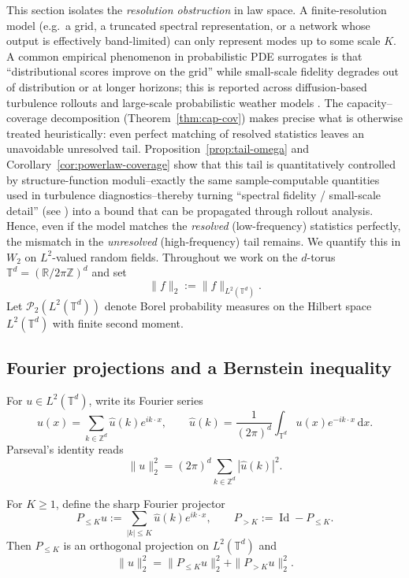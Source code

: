 \documentclass{article}
\numberwithin{equation}{section}
\theoremstyle{plain}
\theoremstyle{definition}
\theoremstyle{remark}
\begin{document}
This section isolates the \emph{resolution obstruction} in law space.
A finite-resolution model (e.g.\ a grid, a truncated spectral representation, or a network whose output
is effectively band-limited) can only represent modes up to some scale $K$. A common empirical phenomenon in probabilistic PDE surrogates is that “distributional scores improve on the grid” while small-scale fidelity degrades out of distribution or at longer horizons; this is reported across diffusion-based turbulence rollouts and large-scale probabilistic weather models \cite{kohl2023benchmarking, bulte2025probabilistic}.
The capacity–coverage decomposition (Theorem~\ref{thm:cap-cov}) makes precise what is otherwise treated heuristically: even perfect matching of resolved statistics leaves an unavoidable unresolved tail. Proposition~\ref{prop:tail-omega} and Corollary~\ref{cor:powerlaw-coverage} show that this tail is quantitatively controlled by structure-function moduli--exactly the same sample-computable quantities used in turbulence diagnostics--thereby turning “spectral fidelity / small-scale detail” (see \cite{armegioiu2025rectified, price2023gencast, oommen2024integrating}) into a bound that can be propagated through rollout analysis. \\


Hence, even if the model matches the \emph{resolved} (low-frequency) statistics perfectly, the mismatch in the
\emph{unresolved} (high-frequency) tail remains. We quantify this in $W_2$ on $L^2$-valued random fields.
Throughout we work on the $d$-torus $\mathbb{T}^d=(\mathbb{R}/2\pi\mathbb{Z})^d$ and set
\[
\|f\|_2 := \|f\|_{L^2(\mathbb{T}^d)}.
\]
Let $\mathcal{P}_2(L^2(\mathbb{T}^d))$ denote Borel probability measures on the Hilbert space
$L^2(\mathbb{T}^d)$ with finite second moment.

\subsection{Fourier projections and a Bernstein inequality}

For $u\in L^2(\mathbb{T}^d)$, write its Fourier series
\[
u(x)=\sum_{k\in\mathbb{Z}^d}\widehat u(k)e^{ik\cdot x},
\qquad
\widehat u(k)=\frac{1}{(2\pi)^d}\int_{\mathbb{T}^d}u(x)e^{-ik\cdot x}\,\mathrm{d}x.
\]
Parseval's identity reads
\[
\|u\|_2^2=(2\pi)^d\sum_{k\in\mathbb{Z}^d}|\widehat u(k)|^2.
\]

For $K\ge 1$, define the sharp Fourier projector
\[
P_{\le K}u := \sum_{|k|\le K}\widehat u(k)e^{ik\cdot x},
\qquad
P_{>K}:=\operatorname{Id}-P_{\le K}.
\]
Then $P_{\le K}$ is an orthogonal projection on $L^2(\mathbb{T}^d)$ and
\[
\|u\|_2^2=\|P_{\le K}u\|_2^2+\|P_{>K}u\|_2^2.
\]
\end{document}
